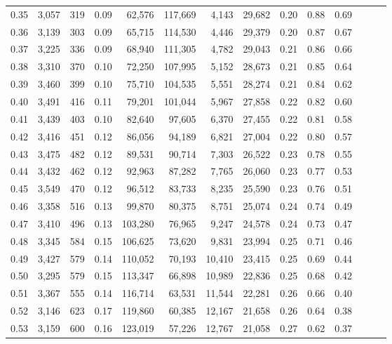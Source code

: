 \begin{tabular}{rrrrrrrrrrrrrr}
0.35 &  3,057 &  319 &  0.09 &   62,576 &  117,669 &   4,143 &  29,682 &  0.20 &  0.88 &      0.69 \\
0.36 &  3,139 &  303 &  0.09 &   65,715 &  114,530 &   4,446 &  29,379 &  0.20 &  0.87 &      0.67 \\
0.37 &  3,225 &  336 &  0.09 &   68,940 &  111,305 &   4,782 &  29,043 &  0.21 &  0.86 &      0.66 \\
0.38 &  3,310 &  370 &  0.10 &   72,250 &  107,995 &   5,152 &  28,673 &  0.21 &  0.85 &      0.64 \\
0.39 &  3,460 &  399 &  0.10 &   75,710 &  104,535 &   5,551 &  28,274 &  0.21 &  0.84 &      0.62 \\
0.40 &  3,491 &  416 &  0.11 &   79,201 &  101,044 &   5,967 &  27,858 &  0.22 &  0.82 &      0.60 \\
0.41 &  3,439 &  403 &  0.10 &   82,640 &   97,605 &   6,370 &  27,455 &  0.22 &  0.81 &      0.58 \\
0.42 &  3,416 &  451 &  0.12 &   86,056 &   94,189 &   6,821 &  27,004 &  0.22 &  0.80 &      0.57 \\
0.43 &  3,475 &  482 &  0.12 &   89,531 &   90,714 &   7,303 &  26,522 &  0.23 &  0.78 &      0.55 \\
0.44 &  3,432 &  462 &  0.12 &   92,963 &   87,282 &   7,765 &  26,060 &  0.23 &  0.77 &      0.53 \\
0.45 &  3,549 &  470 &  0.12 &   96,512 &   83,733 &   8,235 &  25,590 &  0.23 &  0.76 &      0.51 \\
0.46 &  3,358 &  516 &  0.13 &   99,870 &   80,375 &   8,751 &  25,074 &  0.24 &  0.74 &      0.49 \\
0.47 &  3,410 &  496 &  0.13 &  103,280 &   76,965 &   9,247 &  24,578 &  0.24 &  0.73 &      0.47 \\
0.48 &  3,345 &  584 &  0.15 &  106,625 &   73,620 &   9,831 &  23,994 &  0.25 &  0.71 &      0.46 \\
0.49 &  3,427 &  579 &  0.14 &  110,052 &   70,193 &  10,410 &  23,415 &  0.25 &  0.69 &      0.44 \\
0.50 &  3,295 &  579 &  0.15 &  113,347 &   66,898 &  10,989 &  22,836 &  0.25 &  0.68 &      0.42 \\
0.51 &  3,367 &  555 &  0.14 &  116,714 &   63,531 &  11,544 &  22,281 &  0.26 &  0.66 &      0.40 \\
0.52 &  3,146 &  623 &  0.17 &  119,860 &   60,385 &  12,167 &  21,658 &  0.26 &  0.64 &      0.38 \\
0.53 &  3,159 &  600 &  0.16 &  123,019 &   57,226 &  12,767 &  21,058 &  0.27 &  0.62 &      0.37 \\

\end{tabular}
